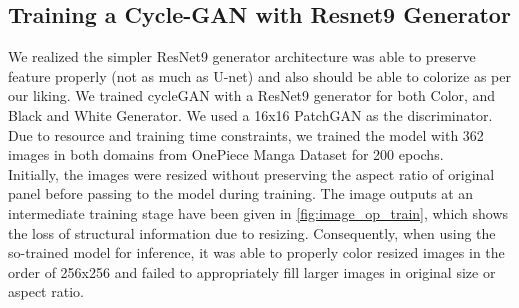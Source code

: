 \subsection{Training a Cycle-GAN with Resnet9 Generator}
We realized the simpler ResNet9 generator architecture was able to preserve feature properly (not as much as U-net) and also should be able to colorize as per our liking.
We trained cycleGAN with a ResNet9 generator for both Color, and Black and White Generator. We used a 16x16 PatchGAN as the discriminator. Due to resource and training time constraints, we trained the model with 362 images in both domains from OnePiece Manga Dataset for 200 epochs.
\\
Initially, the images were resized without preserving the aspect ratio of original panel before passing to the model during training. The image outputs at an intermediate training stage have been given in \ref{fig:image_op_train}, which shows the loss of structural information due to resizing. Consequently, when using the so-trained model for inference, it was able to properly color resized images in the order of 256x256 and failed to appropriately fill larger images in original size or aspect ratio. 

